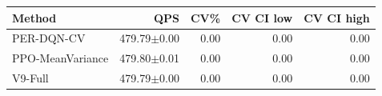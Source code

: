 \begin{tabular}{lrrrr}
\hline
Method & QPS & CV\% & CV CI low & CV CI high \\
\hline
PER-DQN-CV & 479.79$\pm$0.00 & 0.00 & 0.00 & 0.00 \\
PPO-MeanVariance & 479.80$\pm$0.01 & 0.00 & 0.00 & 0.00 \\
V9-Full & 479.79$\pm$0.00 & 0.00 & 0.00 & 0.00 \\
\hline
\end{tabular}